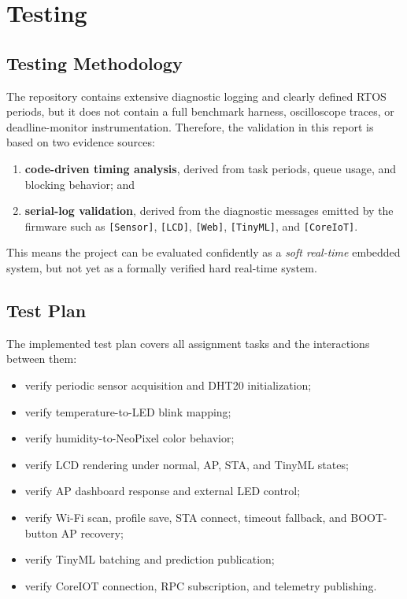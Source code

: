 \section{Testing}

\subsection{Testing Methodology}
The repository contains extensive diagnostic logging and clearly defined RTOS
periods, but it does not contain a full benchmark harness, oscilloscope traces,
or deadline-monitor instrumentation. Therefore, the validation in this report is
based on two evidence sources:
\begin{enumerate}
  \item \textbf{code-driven timing analysis}, derived from task periods, queue
  usage, and blocking behavior; and
  \item \textbf{serial-log validation}, derived from the diagnostic messages
  emitted by the firmware such as \texttt{[Sensor]}, \texttt{[LCD]},
  \texttt{[Web]}, \texttt{[TinyML]}, and \texttt{[CoreIoT]}.
\end{enumerate}

This means the project can be evaluated confidently as a \emph{soft real-time}
embedded system, but not yet as a formally verified hard real-time system.

\subsection{Test Plan}
The implemented test plan covers all assignment tasks and the interactions
between them:
\begin{itemize}
  \item verify periodic sensor acquisition and DHT20 initialization;
  \item verify temperature-to-LED blink mapping;
  \item verify humidity-to-NeoPixel color behavior;
  \item verify LCD rendering under normal, AP, STA, and TinyML states;
  \item verify AP dashboard response and external LED control;
  \item verify Wi-Fi scan, profile save, STA connect, timeout fallback, and
  BOOT-button AP recovery;
  \item verify TinyML batching and prediction publication;
  \item verify CoreIOT connection, RPC subscription, and telemetry publishing.
\end{itemize}

